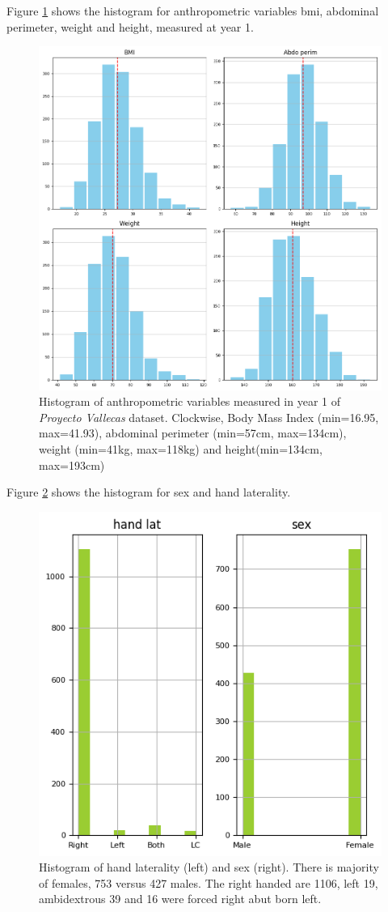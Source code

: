 \documentclass[11pt]{article}
\theoremstyle{definition}
\theoremstyle{remark}
\begin{document}
Figure \ref{fig:anthro} shows the histogram for anthropometric variables bmi, abdominal perimeter, weight and height, measured at year 1.
\begin{figure}[H]
        \centering
        \includegraphics[keepaspectratio, width=.8\linewidth]{figures/Fig_anthro}
        \caption{Histogram of anthropometric variables measured in year 1 of \emph{Proyecto Vallecas} dataset. Clockwise, Body Mass Index (min=16.95, max=41.93), abdominal perimeter (min=57cm, max=134cm), weight (min=41kg, max=118kg) and height(min=134cm, max=193cm)} 
        \label{fig:anthro}
\end{figure}

Figure \ref{fig:sexlat} shows the histogram for sex and hand laterality.
\begin{figure}[H]
        \centering
        \includegraphics[keepaspectratio, width=.4\linewidth]{figures/Fig_sexlat}
        \caption{Histogram of hand laterality (left) and sex (right). There is majority of females, 753 versus 427 males. The right handed are 1106, left 19, ambidextrous 39 and 16 were forced right abut born left.} 
        \label{fig:sexlat}
\end{figure}
\end{document}
